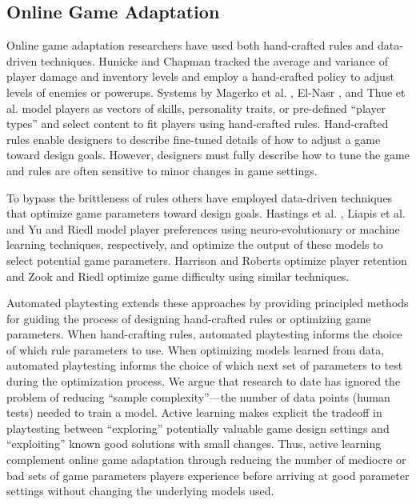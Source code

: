\documentclass{sig-alternate}
\begin{document}
\subsection{Online Game Adaptation}
Online game adaptation researchers have used both hand-crafted rules and data-driven techniques.
Hunicke and Chapman \cite{hunicke2004:dda} tracked the average and variance of player damage and inventory levels and employ a hand-crafted policy to adjust levels of enemies or powerups. 
Systems by Magerko et al. \cite{magerko2006:isat}, El-Nasr \cite{seifel-nasr2007:mirage}, and Thue et al. \cite{thue2007:storytell-pm} model players as vectors of skills, personality traits, or pre-defined ``player types'' and select content to fit players using hand-crafted rules. %
Hand-crafted rules enable designers to describe fine-tuned details of how to adjust a game toward design goals.
However, designers must fully describe how to tune the game and rules are often sensitive to minor changes in game settings.

To bypass the brittleness of rules others have employed data-driven techniques that optimize game parameters toward design goals.
Hastings et al. \cite{hastings2009:gar}, Liapis et al. \cite{liapis2013:rank-based-interactive-evol} and Yu and Riedl \cite{yu2013:storyeti} model player preferences using neuro-evolutionary or machine learning techniques, respectively, and optimize the output of these models to select potential game parameters.
Harrison and Roberts \cite{harrison2013:scrabble-retention} optimize player retention and Zook and Riedl \cite{zook2012:tf} optimize game difficulty using similar techniques.

Automated playtesting extends these approaches by providing principled methods for guiding the process of designing hand-crafted rules or optimizing game parameters.
When hand-crafting rules, automated playtesting informs the choice of which rule parameters to use.
When optimizing models learned from data, automated playtesting informs the choice of which next set of parameters to test during the optimization process.
We argue that research to date has ignored the problem of reducing ``sample complexity''---the number of data points (human tests) needed to train a model.
Active learning makes explicit the tradeoff in playtesting between ``exploring'' potentially valuable game design settings and ``exploiting'' known good solutions with small changes.
Thus, active learning complement online game adaptation through reducing the number of mediocre or bad sets of game parameters players experience before arriving at good parameter settings without changing the underlying models used.
\end{document}
